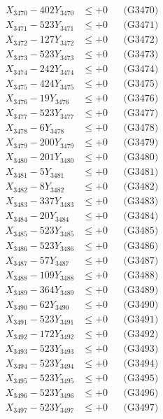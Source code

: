 \documentclass[a4paper,10pt]{article}
\begin{document}
{\begin{align}
X_{3470} - 402Y_{3470} &\leq +0 && \text{(G3470)} \\
\allowbreak
X_{3471} - 523Y_{3471} &\leq +0 && \text{(G3471)} \\
X_{3472} - 127Y_{3472} &\leq +0 && \text{(G3472)} \\
X_{3473} - 523Y_{3473} &\leq +0 && \text{(G3473)} \\
X_{3474} - 242Y_{3474} &\leq +0 && \text{(G3474)} \\
X_{3475} - 424Y_{3475} &\leq +0 && \text{(G3475)} \\
X_{3476} - 19Y_{3476} &\leq +0 && \text{(G3476)} \\
X_{3477} - 523Y_{3477} &\leq +0 && \text{(G3477)} \\
X_{3478} - 6Y_{3478} &\leq +0 && \text{(G3478)} \\
X_{3479} - 200Y_{3479} &\leq +0 && \text{(G3479)} \\
X_{3480} - 201Y_{3480} &\leq +0 && \text{(G3480)} \\
\allowbreak
X_{3481} - 5Y_{3481} &\leq +0 && \text{(G3481)} \\
X_{3482} - 8Y_{3482} &\leq +0 && \text{(G3482)} \\
X_{3483} - 337Y_{3483} &\leq +0 && \text{(G3483)} \\
X_{3484} - 20Y_{3484} &\leq +0 && \text{(G3484)} \\
X_{3485} - 523Y_{3485} &\leq +0 && \text{(G3485)} \\
X_{3486} - 523Y_{3486} &\leq +0 && \text{(G3486)} \\
X_{3487} - 57Y_{3487} &\leq +0 && \text{(G3487)} \\
X_{3488} - 109Y_{3488} &\leq +0 && \text{(G3488)} \\
X_{3489} - 364Y_{3489} &\leq +0 && \text{(G3489)} \\
X_{3490} - 62Y_{3490} &\leq +0 && \text{(G3490)} \\
\allowbreak
X_{3491} - 523Y_{3491} &\leq +0 && \text{(G3491)} \\
X_{3492} - 172Y_{3492} &\leq +0 && \text{(G3492)} \\
X_{3493} - 523Y_{3493} &\leq +0 && \text{(G3493)} \\
X_{3494} - 523Y_{3494} &\leq +0 && \text{(G3494)} \\
X_{3495} - 523Y_{3495} &\leq +0 && \text{(G3495)} \\
X_{3496} - 523Y_{3496} &\leq +0 && \text{(G3496)} \\
X_{3497} - 523Y_{3497} &\leq +0 && \text{(G3497)} \\

\end{align}}
\end{document}
